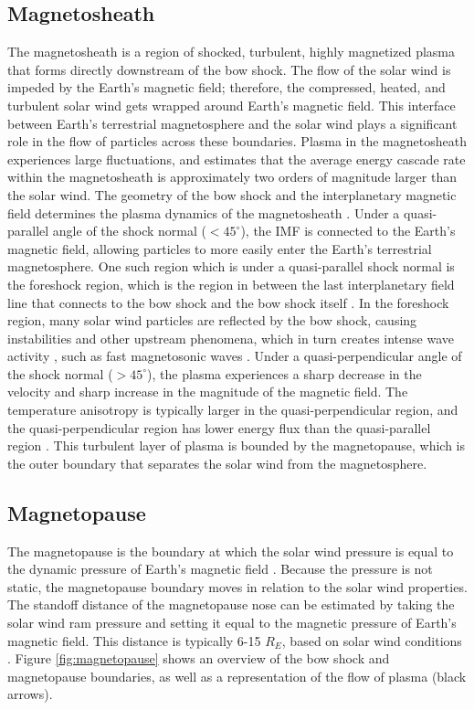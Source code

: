 \subsection{Magnetosheath}
The magnetosheath is a region of shocked, turbulent, highly magnetized plasma that forms directly downstream of the bow shock. The flow of the solar wind is impeded by the Earth's magnetic field; therefore, the compressed, heated, and turbulent solar wind gets wrapped around Earth's magnetic field. This interface between Earth's terrestrial magnetosphere and the solar wind plays a significant role in the flow of particles across these boundaries. Plasma in the magnetosheath experiences large fluctuations, and \cite{Hadid:2018} estimates that the average energy cascade rate within the magnetosheath is approximately two orders of magnitude larger than the solar wind. The geometry of the bow shock and the interplanetary magnetic field determines the plasma dynamics of the magnetosheath \citep{Yordanova:2020}. Under a quasi-parallel angle of the shock normal ($<45^\circ$), the IMF is connected to the Earth's magnetic field, allowing particles to more easily enter the Earth's terrestrial magnetosphere. One such region which is under a quasi-parallel shock normal is the foreshock region, which is the region in between the last interplanetary field line that connects to the bow shock and the bow shock itself \citep{Karlsson:2021}. In the foreshock region, many solar wind particles are reflected by the bow shock, causing instabilities and other upstream phenomena, which in turn creates intense wave activity \citep{turc_transmission_2023}, such as fast magnetosonic waves \citep{Anderson:1994}. Under a quasi-perpendicular angle of the shock normal ($>45^\circ$), the plasma experiences a sharp decrease in the velocity and sharp increase in the magnitude of the magnetic field. The temperature anisotropy is typically larger in the quasi-perpendicular region, and the quasi-perpendicular region has lower energy flux than the quasi-parallel region \citep{Gurchumelia:2022}. This turbulent layer of plasma is bounded by the magnetopause, which is the outer boundary that separates the solar wind from the magnetosphere. 

\subsection{Magnetopause}
The magnetopause is the boundary at which the solar wind pressure is equal to the dynamic pressure of Earth's magnetic field \citep{Shue:1997}. Because the pressure is not static, the magnetopause boundary moves in relation to the solar wind properties. The standoff distance of the magnetopause nose can be estimated by taking the solar wind ram pressure and setting it equal to the magnetic pressure of Earth's magnetic field. This distance is typically 6-15 $R_E$, based on solar wind conditions \citep{Collado-Vega:2023}. Figure \ref{fig:magnetopause} shows an overview of the bow shock and magnetopause boundaries, as well as a representation of the flow of plasma (black arrows). 

